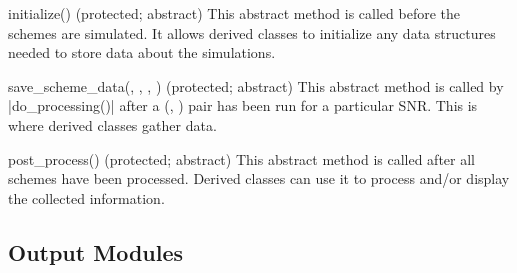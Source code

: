 \begin{method}{initialize(\obj) (protected; abstract)}
  This abstract method is called before the schemes are
  simulated. It allows derived classes to initialize any data structures
  needed to store data about the simulations.
\end{method}

\begin{method}{save_scheme_data(\obj, , , )
  (protected; abstract)}
  This abstract method is called by
  |do_processing()| after a (, ) pair has been run
  for a particular SNR. This is where derived classes gather data.
\end{method}

\begin{method}{post_process(\obj) (protected; abstract)}
  This abstract method is called after all schemes
  have been processed. Derived classes can use it to process and/or display
  the collected information.
\end{method}


\subsection{Output Modules}
